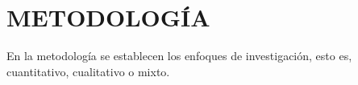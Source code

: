 \section{METODOLOGÍA}


En la metodología se establecen los enfoques de investigación, esto es, cuantitativo, cualitativo o mixto.